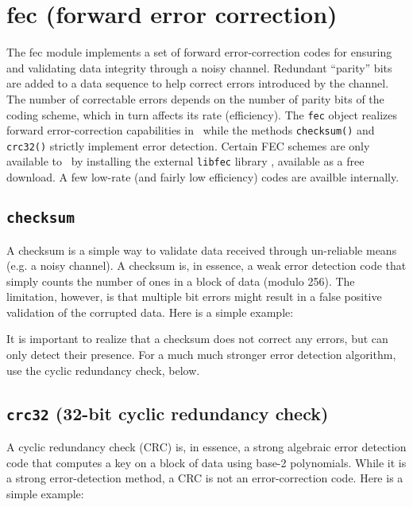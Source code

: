 % 
%

\section{fec (forward error correction)}
\label{module:fec}
The fec module implements a set of forward error-correction codes for
ensuring and validating data integrity through a noisy channel.
Redundant ``parity'' bits are added to a data sequence to help correct
errors introduced by the channel.
The number of correctable errors depends on the number of parity bits of the
coding scheme, which in turn affects its rate (efficiency).
The {\tt fec} object realizes forward error-correction capabilities in
\liquid\ while the methods {\tt checksum()} and {\tt crc32()} strictly
implement error detection.
Certain FEC schemes are only available to \liquid\ by installing the external
{\tt libfec} library \cite{fec:web}, available as a free download.
A few low-rate (and fairly low efficiency) codes are availble internally.


\subsection{{\tt checksum}}
\label{module:fec:checksum}
A checksum is a simple way to validate data received through un-reliable means
(e.g. a noisy channel).
A checksum is, in essence, a weak error detection code that simply counts the
number of ones in a block of data (modulo 256).
The limitation, however, is that multiple bit errors might result in a false
positive validation of the corrupted data.
Here is a simple example:
%

%
It is important to realize that a checksum does not correct any errors, but
can only detect their presence.
For a much much stronger error detection algorithm, use the cyclic redundancy
check, below.

\subsection{{\tt crc32} (32-bit cyclic redundancy check)}
\label{module:fec:crc32}
A cyclic redundancy check (CRC) is, in essence, a strong algebraic error
detection code that computes a key on a block of data using base-2
polynomials.
While it is a strong error-detection method, a CRC is not an error-correction
code.
Here is a simple example:
%


